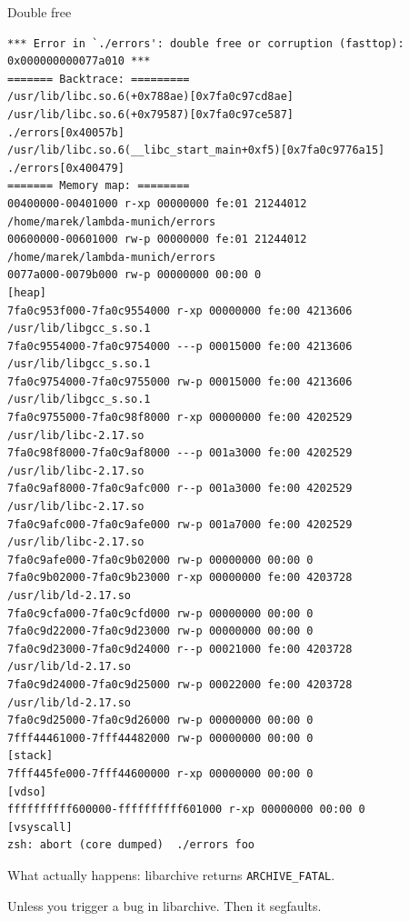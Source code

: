 \documentclass{beamer}
\begin{document}
\begin{frame}[fragile]{Double free}
\begin{verbatim}
*** Error in `./errors': double free or corruption (fasttop): 0x000000000077a010 ***
======= Backtrace: =========
/usr/lib/libc.so.6(+0x788ae)[0x7fa0c97cd8ae]
/usr/lib/libc.so.6(+0x79587)[0x7fa0c97ce587]
./errors[0x40057b]
/usr/lib/libc.so.6(__libc_start_main+0xf5)[0x7fa0c9776a15]
./errors[0x400479]
======= Memory map: ========
00400000-00401000 r-xp 00000000 fe:01 21244012                           /home/marek/lambda-munich/errors
00600000-00601000 rw-p 00000000 fe:01 21244012                           /home/marek/lambda-munich/errors
0077a000-0079b000 rw-p 00000000 00:00 0                                  [heap]
7fa0c953f000-7fa0c9554000 r-xp 00000000 fe:00 4213606                    /usr/lib/libgcc_s.so.1
7fa0c9554000-7fa0c9754000 ---p 00015000 fe:00 4213606                    /usr/lib/libgcc_s.so.1
7fa0c9754000-7fa0c9755000 rw-p 00015000 fe:00 4213606                    /usr/lib/libgcc_s.so.1
7fa0c9755000-7fa0c98f8000 r-xp 00000000 fe:00 4202529                    /usr/lib/libc-2.17.so
7fa0c98f8000-7fa0c9af8000 ---p 001a3000 fe:00 4202529                    /usr/lib/libc-2.17.so
7fa0c9af8000-7fa0c9afc000 r--p 001a3000 fe:00 4202529                    /usr/lib/libc-2.17.so
7fa0c9afc000-7fa0c9afe000 rw-p 001a7000 fe:00 4202529                    /usr/lib/libc-2.17.so
7fa0c9afe000-7fa0c9b02000 rw-p 00000000 00:00 0 
7fa0c9b02000-7fa0c9b23000 r-xp 00000000 fe:00 4203728                    /usr/lib/ld-2.17.so
7fa0c9cfa000-7fa0c9cfd000 rw-p 00000000 00:00 0 
7fa0c9d22000-7fa0c9d23000 rw-p 00000000 00:00 0 
7fa0c9d23000-7fa0c9d24000 r--p 00021000 fe:00 4203728                    /usr/lib/ld-2.17.so
7fa0c9d24000-7fa0c9d25000 rw-p 00022000 fe:00 4203728                    /usr/lib/ld-2.17.so
7fa0c9d25000-7fa0c9d26000 rw-p 00000000 00:00 0 
7fff44461000-7fff44482000 rw-p 00000000 00:00 0                          [stack]
7fff445fe000-7fff44600000 r-xp 00000000 00:00 0                          [vdso]
ffffffffff600000-ffffffffff601000 r-xp 00000000 00:00 0                  [vsyscall]
zsh: abort (core dumped)  ./errors foo
\end{verbatim}
\end{frame}

\begin{frame}
  What actually happens: libarchive returns \texttt{ARCHIVE\_FATAL}.\pause

  Unless you trigger a bug in libarchive. \pause
  \alert{Then it segfaults.}
\end{frame}
\end{document}
